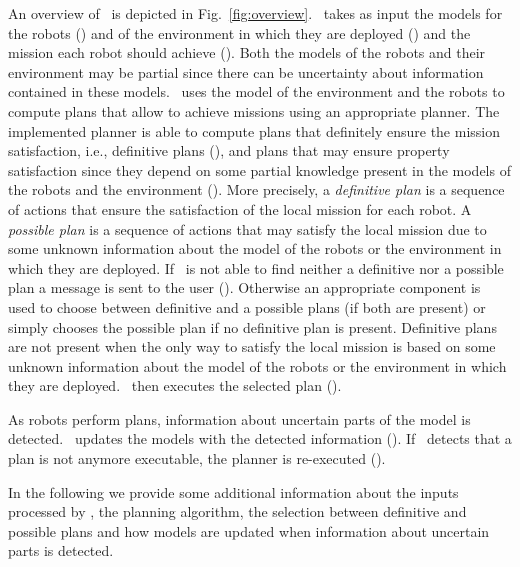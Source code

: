 
An overview of \toolName\ is depicted in Fig.~\ref{fig:overview}.
\toolName\ takes as input the models for the robots () and of the environment in which they are deployed () and the mission each robot should achieve ().
Both the models of the robots and their environment may be partial since there can be uncertainty about information contained in these models.
\toolName\ uses the model of the environment and the robots to compute plans that allow to achieve missions using an appropriate planner.
The implemented planner is able to compute plans that definitely ensure the mission satisfaction, i.e., definitive plans  (), and plans that may ensure property satisfaction since they depend on some partial knowledge present in the models of the robots and the environment  ().
More precisely, a \emph{definitive plan} is a sequence of actions that ensure the satisfaction of the local mission for each robot. 
A \emph{possible plan} is a sequence of actions that may satisfy the local mission due to some unknown information about the model of the robots or the environment in which they are deployed. 
If \toolName\ is not able to find neither a definitive nor a possible plan a message is sent to the user ().
Otherwise an appropriate component is used to choose between definitive and a possible plans (if both are present) or simply chooses the possible plan if no definitive plan is present.
Definitive plans are not present when the only way to satisfy the local mission is based on some unknown information about the model of the robots or the environment in which they are deployed. 
\toolName\ then executes the selected plan ().

As robots perform plans, information about uncertain parts of the model is detected.
\toolName\ updates the  models with the detected information ().
If \toolName\  detects that a plan is not anymore executable, the planner is re-executed ().




In the following we provide some additional information about the inputs processed  by \toolName, the planning algorithm, the selection between definitive and possible plans and how models are updated when information about uncertain parts is detected.




